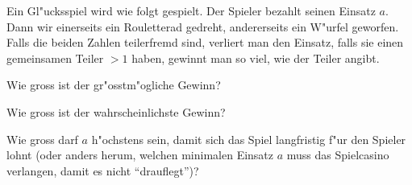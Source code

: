 Ein Gl"ucksspiel wird wie folgt gespielt. Der Spieler bezahlt seinen
Einsatz $a$. Dann wir einerseits ein
Rouletterad gedreht, andererseits ein W"urfel geworfen. Falls
die beiden Zahlen teilerfremd sind, verliert man den Einsatz, falls
sie einen gemeinsamen Teiler $>1$ haben, gewinnt man so viel, wie
der Teiler angibt.
\begin{teilaufgaben}
\item Wie gross ist der gr"osstm"ogliche Gewinn?
\item Wie gross ist der wahrscheinlichste Gewinn?
\item Wie gross darf $a$ h"ochstens sein, damit sich das Spiel langfristig
f"ur den Spieler lohnt (oder anders herum, welchen minimalen Einsatz $a$
muss das Spielcasino verlangen, damit es nicht ``drauflegt'')?
\end{teilaufgaben}

